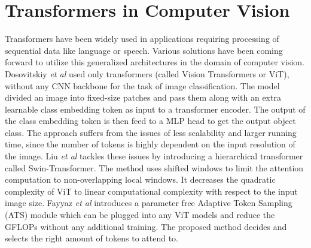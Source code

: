 \section{Transformers in Computer Vision}
\par Transformers \cite{tfm} have been widely used in applications requiring processing of sequential data like language or speech. Various solutions have been coming forward to utilize this generalized architectures in the domain of computer vision. Dosovitskiy \textit{et al} \cite{dosovitskiy2020vit} used only transformers (called Vision Transformers or ViT), without any CNN backbone for the task of image classification. The model divided an image into fixed-size patches and pass them along with an extra learnable class embedding token as input to a transformer encoder. The output of the class embedding token is then feed to a MLP head to get the output object class. The approach suffers from the issues of less scalability and larger running time, since the number of tokens is highly dependent on the input resolution of the image. Liu \textit{et al} \cite{liu2021swin} tackles these issues by introducing a hierarchical transformer called Swin-Transformer. The method uses shifted windows to limit the attention computation to non-overlapping local windows. It decreases the quadratic complexity of ViT to linear computational complexity with respect to the input image size. Fayyaz \textit{et al} \cite{fayyaz2021ats} introduces a parameter free Adaptive Token Sampling (ATS) module which can be plugged into any ViT models and reduce the GFLOPs without any additional training. The proposed method decides and selects the right amount of tokens to attend to. 
